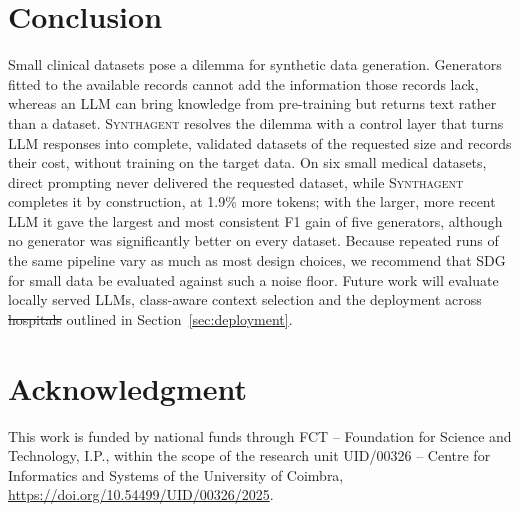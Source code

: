 \documentclass[conference]{IEEEtran}
\newcommand{\system}{\textsc{Synthagent}\xspace}
\providecommand{\DIFaddtex}[1]{{\protect\color{blue}\uwave{#1}}} %
\providecommand{\DIFdeltex}[1]{{\protect\color{red}\sout{#1}}}                      %
\providecommand{\DIFaddbegin}{} %
\providecommand{\DIFaddend}{} %
\providecommand{\DIFdelbegin}{} %
\providecommand{\DIFdelend}{} %
\providecommand{\DIFadd}[1]{\texorpdfstring{\DIFaddtex{#1}}{#1}} %
\providecommand{\DIFdel}[1]{\texorpdfstring{\DIFdeltex{#1}}{}} %
\newcommand{\DIFscaledelfig}{0.5}
\newlength{\DIFdelgraphicswidth} %
\newlength{\DIFdelgraphicsheight} %
\newcommand{\DIFaddincludegraphics}[2][]{{\color{blue}\fbox{\DIFOincludegraphics[#1]{#2}}}} %
\newcommand{\DIFdelincludegraphics}[2][]{%
\sbox{\DIFdelgraphicsbox}{\DIFOincludegraphics[#1]{#2}}%
\settoboxwidth{\DIFdelgraphicswidth}{\DIFdelgraphicsbox} %
\settoboxtotalheight{\DIFdelgraphicsheight}{\DIFdelgraphicsbox} %
\scalebox{\DIFscaledelfig}{%
\parbox[b]{\DIFdelgraphicswidth}{\usebox{\DIFdelgraphicsbox}\\[-\baselineskip] \rule{\DIFdelgraphicswidth}{0em}}\llap{\resizebox{\DIFdelgraphicswidth}{\DIFdelgraphicsheight}{%
\setlength{\unitlength}{\DIFdelgraphicswidth}%
\begin{picture}(1,1)%
\thicklines\linethickness{2pt} %
{\color[rgb]{1,0,0}\put(0,0){\framebox(1,1){}}}%
{\color[rgb]{1,0,0}\put(0,0){\line( 1,1){1}}}%
{\color[rgb]{1,0,0}\put(0,1){\line(1,-1){1}}}%
\end{picture}%
}\hspace*{3pt}}} %
} %
\DeclareRobustCommand{\DIFaddbegin}{\DIFOaddbegin \let\includegraphics\DIFaddincludegraphics} %
\DeclareRobustCommand{\DIFaddend}{\DIFOaddend \let\includegraphics\DIFOincludegraphics} %
\DeclareRobustCommand{\DIFdelbegin}{\DIFOdelbegin \let\includegraphics\DIFdelincludegraphics} %
\DeclareRobustCommand{\DIFdelend}{\DIFOaddend \let\includegraphics\DIFOincludegraphics} %
\begin{document}
\section{Conclusion}
\label{sec:conclusion}
Small clinical datasets pose a dilemma for synthetic data generation. Generators fitted to the available records cannot add the information those records lack, whereas an LLM can bring knowledge from pre-training but returns text rather than a dataset. \system resolves the dilemma with a control layer that turns LLM responses into complete, validated datasets of the requested size and records their cost, without training on the target data. On six small medical datasets, direct prompting never delivered the requested dataset, while \system completes it by construction, at 1.9\% more tokens; with the larger, more recent LLM it gave the largest and most consistent F1 gain of five generators, although no generator was significantly better on every dataset. Because repeated runs of the same pipeline vary as much as most design choices, we recommend that SDG for small data be evaluated against such a noise floor. Future work will evaluate locally served LLMs, class-aware context selection and the deployment across \DIFdelbegin \DIFdel{hospitals }\DIFdelend \DIFaddbegin \DIFadd{healthcare facilities }\DIFaddend outlined in Section~\ref{sec:deployment}.

\section*{Acknowledgment}
This work is funded by national funds through FCT -- Foundation for Science and Technology, I.P., within the scope of the research unit UID/00326 -- Centre for Informatics and Systems of the University of Coimbra, \url{https://doi.org/10.54499/UID/00326/2025}.



\end{document}
